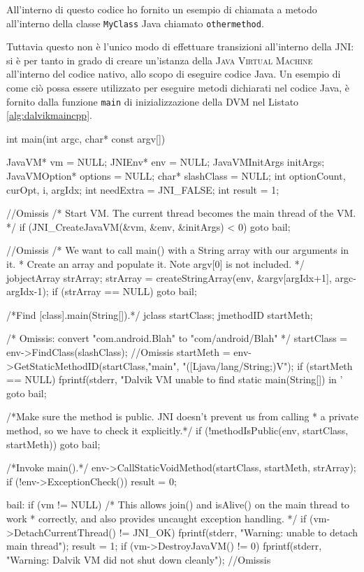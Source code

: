 All'interno di questo codice ho fornito un esempio di chiamata a metodo all'interno
della classe \texttt{\small MyClass} Java chiamato \texttt{\small othermethod}.
\bigskip

Tuttavia questo non è l'unico modo di effettuare transizioni all'interno della
JNI: si è per tanto in grado di creare un'istanza della \textsc{Java Virtual Machine} 
all'interno del codice nativo, allo scopo di eseguire codice Java. Un esempio
di come ciò possa essere utilizzato per eseguire metodi dichiarati nel codice Java, è fornito dalla
funzione \texttt{\small main} di inizializzazione della DVM nel Listato \vref{alg:dalvikmaincpp}.

\begin{algorithm}[thp]
\begin{cpp}[caption=$ $dalvik/dalvikvm/Main.cpp,label=alg:dalvikmaincpp]
int main(int argc, char* const argv[])
{
    JavaVM* vm = NULL;
    JNIEnv* env = NULL;
    JavaVMInitArgs initArgs;
    JavaVMOption* options = NULL;
    char* slashClass = NULL;
    int optionCount, curOpt, i, argIdx;
    int needExtra = JNI_FALSE;
    int result = 1;

    //Omissis
    /* Start VM.  The current thread becomes the main thread of the VM. */
    if (JNI_CreateJavaVM(&vm, &env, &initArgs) < 0) goto bail;

    //Omissis
    /* We want to call main() with a String array with our arguments in it.
     * Create an array and populate it.  Note argv[0] is not included. */
    jobjectArray strArray;
    strArray = createStringArray(env, &argv[argIdx+1], argc-argIdx-1);
    if (strArray == NULL) goto bail;

    /*Find [class].main(String[]).*/
    jclass startClass;
    jmethodID startMeth;

    /* Omissis: convert "com.android.Blah" to "com/android/Blah" */
    startClass = env->FindClass(slashClass);
    //Omissis
    startMeth = env->GetStaticMethodID(startClass,"main", "([Ljava/lang/String;)V");
    if (startMeth == NULL) {
        fprintf(stderr, "Dalvik VM unable to find static main(String[]) in '%
        goto bail;
    }

    /*Make sure the method is public.  JNI doesn't prevent us from calling
     * a private method, so we have to check it explicitly.*/
    if (!methodIsPublic(env, startClass, startMeth)) goto bail;

    /*Invoke main().*/
    env->CallStaticVoidMethod(startClass, startMeth, strArray);
    if (!env->ExceptionCheck()) result = 0;

bail:
    if (vm != NULL) {
        /* This allows join() and isAlive() on the main thread to work
         * correctly, and also provides uncaught exception handling. */
        if (vm->DetachCurrentThread() != JNI_OK) {
         fprintf(stderr, "Warning: unable to detach main thread\n"); result = 1;
        }
        if (vm->DestroyJavaVM() != 0)
            fprintf(stderr, "Warning: Dalvik VM did not shut down cleanly\n");
    }
    //Omissis
}
\end{cpp}
\end{algorithm}



